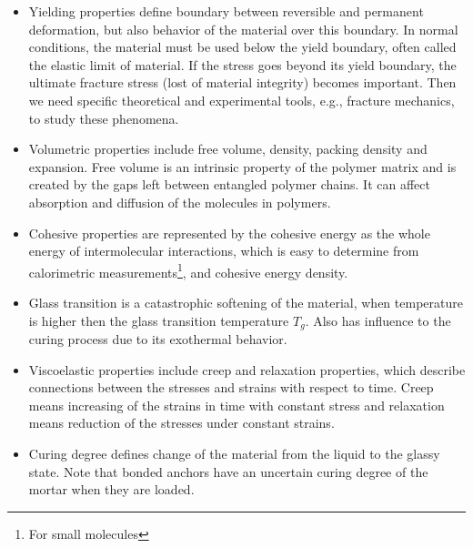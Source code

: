 \begin{itemize}
	\item 	Yielding properties define boundary between reversible and permanent deformation, but also behavior of the material over this boundary. In normal conditions, the material must be used below the yield boundary, often called the elastic limit of material. If the stress goes beyond its yield boundary, the ultimate fracture stress (lost of material integrity) becomes important. Then we need specific theoretical and experimental tools, e.g., fracture mechanics, to study these phenomena.
	
	\item Volumetric properties include free volume, density, packing density and expansion. Free volume is an intrinsic property of the polymer matrix and is created by the gaps left between entangled polymer chains. It can affect absorption and diffusion of the molecules in polymers.
	
	\item Cohesive properties are represented by the cohesive energy as the whole energy of intermolecular interactions, which is easy to determine from calorimetric measurements\footnote{For small molecules}, and cohesive energy density.
	
	\item Glass transition is a catastrophic softening of the material, when temperature is higher then the glass transition temperature $T_g$. Also has influence to the curing process due to its exothermal behavior. 
	
	\item Viscoelastic properties include creep and relaxation properties, which describe connections between the stresses and strains with respect to time. Creep means increasing of the strains in time with constant stress and relaxation means reduction of the stresses under constant strains. 
	
	\item Curing degree defines change of the material from the liquid to the glassy state. Note that bonded anchors have an uncertain curing degree of the mortar when they are loaded.
	
\end{itemize}

